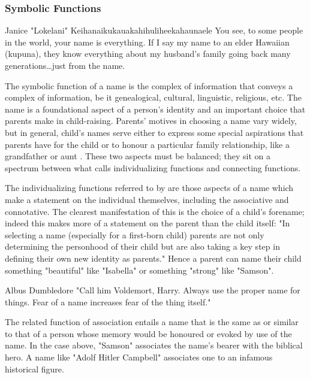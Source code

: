 \subsubsection{Symbolic Functions}

\begin{aquote}{Janice "Lokelani" Keihanaikukauakahihuliheekahaunaele
	\parencite{lee-valley}}
	You see, to some people in the world, your name is everything. If I say my
	name to an elder Hawaiian (kupuna), they know everything about my husband's
	family going back many generations…just from the name.
\end{aquote}

The symbolic function of a name is the complex of information that conveys a complex of information, be it genealogical, cultural, linguistic, religious, etc. The name is a foundational aspect of a person's identity and an important choice that parents make in child-raising. Parents' motives in choosing a name vary widely, but in general, child's names serve either to express some special aspirations that parents have for the child or to honour a particular family relationship, like a grandfather or aunt \parencite{finch08}. These two aspects must be balanced; they sit on a spectrum between what \textcite{finch08} calls individualizing functions and connecting functions.

The individualizing functions referred to by \textcite{finch08} are those aspects of a name which make a statement on the individual themselves, including the associative and connotative. The clearest manifestation of this is the choice of a child's forename; indeed this makes more of a statement on the parent than the child itself: "In selecting a name (especially for a first-born child) parents are not only determining the personhood of their child but are also taking a key step in defining their own new identity as parents." \parencite[718]{finch08} \parencite[399]{heymann11} Hence a parent can name their child something "beautiful" like "Isabella" or something "strong" like "Samson".

\begin{aquote}{Albus Dumbledore}
"Call him Voldemort, Harry. Always use the proper name for things. Fear of a
name increases fear of the thing itself." \parencite{rowling97}
\end{aquote}

The related function of association entails a name that is the same as or similar to that of a person whose memory would be honoured or evoked by use of the name. In the case above, "Samson" associates the name's bearer with the biblical hero. A name like "Adolf Hitler Campbell" associates one to an infamous historical figure. 

